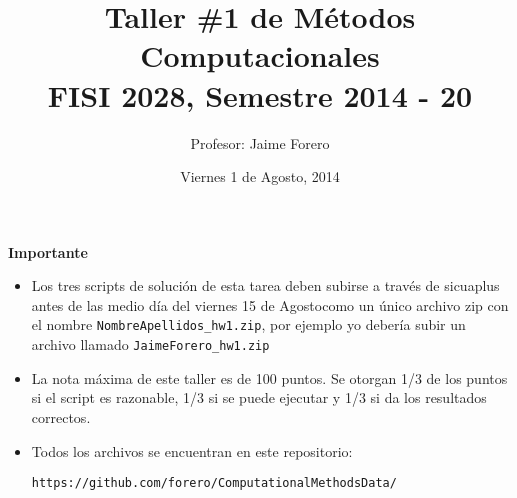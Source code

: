 \documentclass{article}
\title{Taller \#1 de M\'etodos Computacionales\\ FISI 2028, Semestre 2014 - 20}
\author{Profesor: Jaime Forero}
\date{Viernes 1 de Agosto, 2014}
\begin{document}
\maketitle
\thispagestyle{empty}


{\bf Importante}
\begin{itemize}

\item Los tres scripts de soluci\'on de esta tarea deben subirse a
  trav\'es de sicuaplus antes de las medio d\'ia del viernes 15 de Agostocomo
  un \'unico archivo zip con el nombre
  \verb"NombreApellidos_hw1.zip", por ejemplo yo deber\'ia subir un
  archivo llamado \verb"JaimeForero_hw1.zip"

\item La nota m\'axima de este taller es de 100 puntos. Se otorgan 1/3 de los puntos si el script es razonable, 1/3 si se puede ejecutar y 1/3 si da los resultados correctos.

\item Todos los archivos se encuentran en este repositorio:

  \verb"https://github.com/forero/ComputationalMethodsData/"
\end{itemize}
\end{document}
